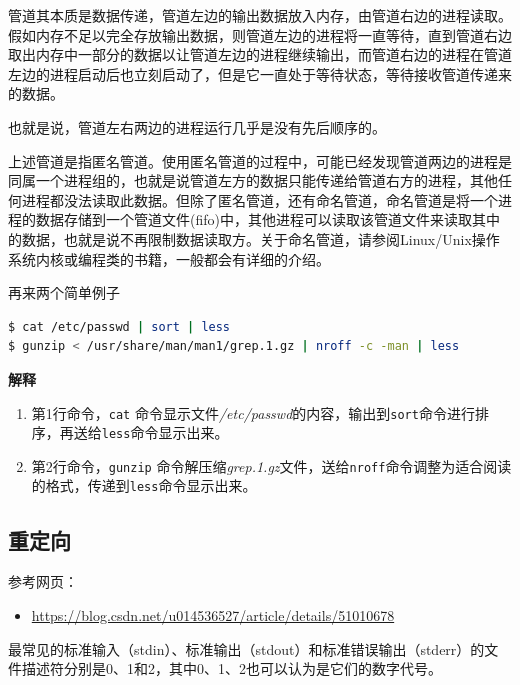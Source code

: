 \documentclass[doctor,openright,twoside]{sjtuthesis}
\providecommand{\tightlist}{%
    \setlength{\itemsep}{0pt}\setlength{\parskip}{0pt}}
\newcommand{\passthrough}[1]{#1}
\theoremstyle{plain}
\theoremstyle{definition}
\theoremstyle{remark}
\theoremstyle{ocrenumbox}
\theoremstyle{plain}
\begin{document}
管道其本质是数据传递，管道左边的输出数据放入内存，由管道右边的进程读取。假如内存不足以完全存放输出数据，则管道左边的进程将一直等待，直到管道右边取出内存中一部分的数据以让管道左边的进程继续输出，而管道右边的进程在管道左边的进程启动后也立刻启动了，但是它一直处于等待状态，等待接收管道传递来的数据。

也就是说，管道左右两边的进程运行几乎是没有先后顺序的。

上述管道是指匿名管道。使用匿名管道的过程中，可能已经发现管道两边的进程是同属一个进程组的，也就是说管道左方的数据只能传递给管道右方的进程，其他任何进程都没法读取此数据。但除了匿名管道，还有命名管道，命名管道是将一个进程的数据存储到一个管道文件(fifo)中，其他进程可以读取该管道文件来读取其中的数据，也就是说不再限制数据读取方。关于命名管道，请参阅Linux/Unix操作系统内核或编程类的书籍，一般都会有详细的介绍。

再来两个简单例子

\begin{lstlisting}[language=bash]
$ cat /etc/passwd | sort | less
$ gunzip < /usr/share/man/man1/grep.1.gz | nroff -c -man | less
\end{lstlisting}

\textbf{解释}

\begin{enumerate}
\def\labelenumi{\arabic{enumi}.}
\tightlist
\item
  第1行命令，\passthrough{\lstinline!cat!}
  命令显示文件\emph{/etc/passwd}的内容，输出到\passthrough{\lstinline!sort!}命令进行排序，再送给\passthrough{\lstinline!less!}命令显示出来。
\item
  第2行命令，\passthrough{\lstinline!gunzip!}
  命令解压缩\emph{grep.1.gz}文件，送给\passthrough{\lstinline!nroff!}命令调整为适合阅读的格式，传递到\passthrough{\lstinline!less!}命令显示出来。
\end{enumerate}

\hypertarget{sec:redirect}{%
\subsection{重定向}\label{sec:redirect}}

参考网页：

\begin{itemize}
\tightlist
\item
  \url{https://blog.csdn.net/u014536527/article/details/51010678}
\end{itemize}

最常见的标准输入（stdin）、标准输出（stdout）和标准错误输出（stderr）的文件描述符分别是0、1和2，其中0、1、2也可以认为是它们的数字代号。
\end{document}
